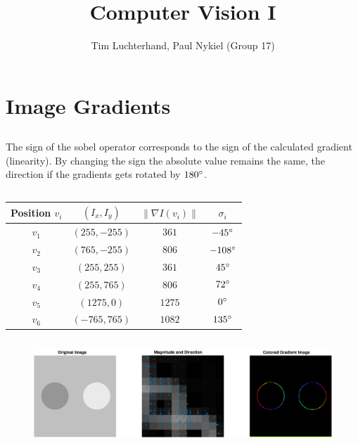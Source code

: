 \documentclass[DIN, pagenumber=false, fontsize=11pt, parskip=half]{scrartcl}
\title{Computer Vision I}
\author{Tim Luchterhand, Paul Nykiel (Group 17)}
\newcommand{\norm}[1]{\left\lVert#1\right\rVert}
\begin{document}
    \maketitle
    \section{Image Gradients}
    \subsection{}
    The sign of the sobel operator corresponds to the sign of the calculated gradient (linearity). By changing the sign the absolute value remains the same,
    the direction if the gradients gets rotated by $180 \degree$.
    \subsection{}
    \begin{table}[H]
        \centering
        \begin{tabular}{cccc}
            \toprule
            Position $v_i$ & $(I_x, I_y)$ & $\norm{\nabla I(v_i)}$ & $\sigma_i$ \\
            \midrule
            $v_1$ & $(255, -255)$ & $361$  & $-45\degree$ \\
            $v_2$ & $(765, -255)$ & $806$  & $-108\degree$ \\
            $v_3$ & $(255,  255)$ & $361$  & $45\degree$ \\
            $v_4$ & $(255,  765)$ & $806$  & $72\degree$ \\
            $v_5$ & $(1275,   0)$ & $1275$ & $0\degree$ \\
            $v_6$ & $(-765, 765)$ & $1082$ & $135\degree$\\
            \bottomrule
        \end{tabular}
    \end{table}
    \subsection{}
    
    \subsection{}
    \begin{figure}[H]
        \centering
        \includegraphics[width=\textwidth]{sh03ex01.eps}
    \end{figure}
\end{document}
